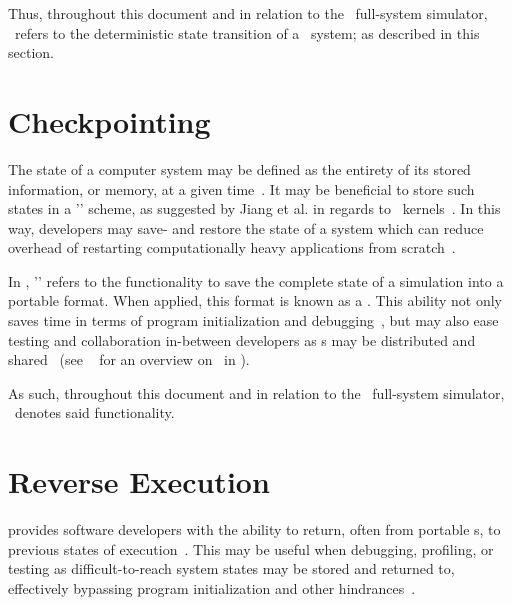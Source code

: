 Thus, throughout this document and in relation to the \dvttermsimics\ full-system simulator, \dvttermdeterministicexecution\ refers to the deterministic state transition of a \dvttermtarget\ system; as described in this section.

\section{Checkpointing}
\label{sec:simics_checkpointing}
The state of a computer system may be defined as the entirety of its stored information, or memory, at a given time~.
It may be beneficial to store such states in a '\dvttermcheckpointrestart ' scheme, as suggested by Jiang et al. in regards to \dvttermcuda\ kernels~.
In this way, developers may save- and restore the state of a system which can reduce overhead of restarting computationally heavy applications from scratch~.

In \dvttermsimics , '\dvttermcheckpointing ' refers to the functionality to save the complete state of a simulation into a portable format.
When applied, this format is known as a \dvttermcheckpoint .
This ability not only  saves time in terms of program initialization and debugging~, but may also ease testing and collaboration in-between developers as \dvttermcheckpoint s may be distributed and shared~ (see ~ for an overview on \dvttermcheckpointing\ in \dvttermsimics ).

As such, throughout this document and in relation to the \dvttermsimics\ full-system simulator, \dvttermcheckpointing\ denotes said functionality.

\section{Reverse Execution}
\label{sec:simics_reverseexecution}
 provides software developers with the ability to return, often from portable \dvttermcheckpoint s, to previous states of execution~.
This may be useful when debugging, profiling, or testing as difficult-to-reach system states may be stored and returned to, effectively bypassing program initialization and other hindrances~.


